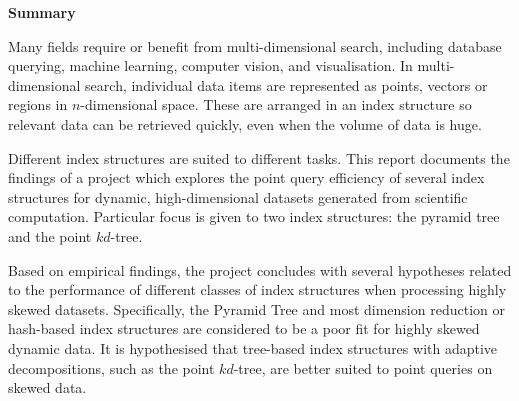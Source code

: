 \begin{center}
    {\LARGE\bf Summary}
\end{center}

Many fields require or benefit from multi-dimensional search, including database querying, machine learning, computer vision, and visualisation. In multi-dimensional search, individual data items are represented as points, vectors or regions in $n$-dimensional space. These are arranged in an index structure so relevant data can be retrieved quickly, even when the volume of data is huge.

Different index structures are suited to different tasks. This report documents the findings of a project which explores the point query efficiency of several index structures for dynamic, high-dimensional datasets generated from scientific computation. Particular focus is given to two index structures: the pyramid tree and the point $kd$-tree.

Based on empirical findings, the project concludes with several hypotheses related to the performance of different classes of index structures when processing highly skewed datasets. Specifically, the Pyramid Tree and most dimension reduction or hash-based index structures are considered to be a poor fit for highly skewed dynamic data. It is hypothesised that tree-based index structures with adaptive decompositions, such as the point $kd$-tree, are better suited to point queries on skewed data.